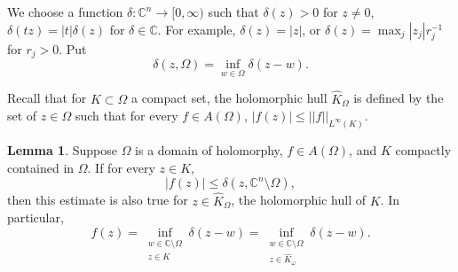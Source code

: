 \documentclass[12pt]{report}
\newcommand{\CC}{\mathbb{C}}
\theoremstyle{definition}
\newtheorem{lemma}[theorem]{Lemma}
\begin{document}
We choose a function $\delta: \CC^n \to [0, \infty)$ such that $\delta(z) > 0$ for $z \neq 0$, $\delta(tz) = |t|\delta(z)$ for $\delta \in \CC$. For example, $\delta(z) = |z|$, or $\delta(z) = \max_j |z_j|r_j^{-1}$ for $r_j > 0$. Put
$$\delta(z, \Omega) = \inf_{w \in \Omega} \delta(z - w).$$

Recall that for $K \subset \Omega$ a compact set, the holomorphic hull $\hat K_\Omega$ is defined by the set of $z \in \Omega$ such that for every $f \in A(\Omega)$, $|f(z)| \leq ||f||_{L^\infty(K)}$.

\begin{lemma}
    Suppose $\Omega$ is a domain of holomorphy, $f \in A(\Omega)$, and $K$ compactly contained in $\Omega$. If for every $z \in K$,
    $$|f(z)| \leq \delta(z, \CC^n \setminus \Omega),$$
    then this estimate is also true for $z \in \hat K_\Omega$, the holomorphic hull of $K$. In particular,
    $$f(z) = \inf_{\substack{w \in \CC \setminus \Omega\\z \in K}} \delta(z - w) = \inf_{\substack{w \in \CC \setminus \Omega\\z \in \hat K_\omega}}
 \delta(z - w).$$\end{lemma}
\end{document}

